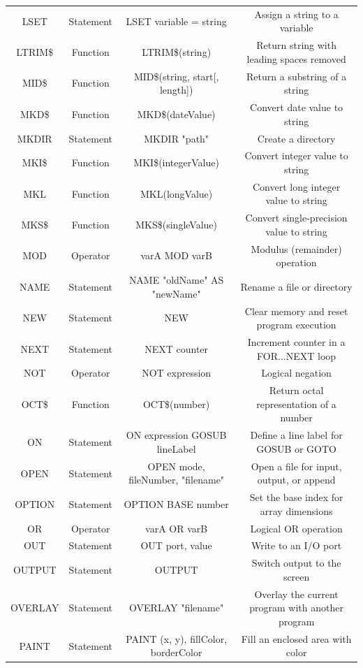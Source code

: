 \documentclass[10pt, reqno]{exam}
\begin{document}
{\begin{longtable}{|c|c|c|c|}
    LSET & Statement & LSET variable = string & Assign a string to a variable \\
    LTRIM\$ & Function & LTRIM\$(string) & Return string with leading spaces removed \\
    MID\$ & Function & MID\$(string, start[, length]) & Return a substring of a string \\
    MKD\$ & Function & MKD\$(dateValue) & Convert date value to string \\
    MKDIR & Statement & MKDIR "path" & Create a directory \\
    MKI\$ & Function & MKI\$(integerValue) & Convert integer value to string \\
    MKL & Function & MKL(longValue) & Convert long integer value to string \\
    MKS\$ & Function & MKS\$(singleValue) & Convert single-precision value to string \\
    MOD & Operator & varA MOD varB & Modulus (remainder) operation \\
    NAME & Statement & NAME "oldName" AS "newName" & Rename a file or directory \\
    NEW & Statement & NEW & Clear memory and reset program execution \\
    NEXT & Statement & NEXT counter & Increment counter in a FOR...NEXT loop \\
    NOT & Operator & NOT expression & Logical negation \\
    OCT\$ & Function & OCT\$(number) & Return octal representation of a number \\
    ON & Statement & ON expression GOSUB lineLabel & Define a line label for GOSUB or GOTO \\
    OPEN & Statement & OPEN mode, fileNumber, "filename" & Open a file for input, output, or append \\
    OPTION & Statement & OPTION BASE number & Set the base index for array dimensions \\
    OR & Operator & varA OR varB & Logical OR operation \\
    OUT & Statement & OUT port, value & Write to an I/O port \\
    OUTPUT & Statement & OUTPUT & Switch output to the screen \\
    OVERLAY & Statement & OVERLAY "filename" & Overlay the current program with another program \\
    PAINT & Statement & PAINT (x, y), fillColor, borderColor & Fill an enclosed area with color \\

\end{longtable}}
\end{document}
